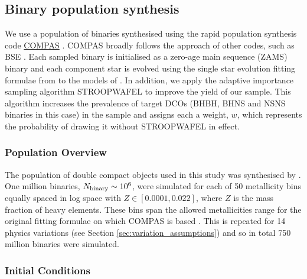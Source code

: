 \documentclass[twocolumn]{aastex63}
\begin{document}
\subsection{Binary population synthesis}\label{sec:COMPAS_explained}

We use a population of binaries synthesised using the rapid population synthesis code \href{https://compas.science}{COMPAS} \citep{Stevenson+2017, Vigna-Gomez+2018, Stevenson+2019}. COMPAS broadly follows the approach of other codes, such as BSE \citep{Hurley+2002}. Each sampled binary is initialised as a zero-age main sequence (ZAMS) binary and each component star is evolved using the single star evolution fitting formulae from \citet{Hurley+2000} to the models of \citet{Pols+1998}. In addition, we apply the adaptive importance sampling algorithm STROOPWAFEL \citep{Broekgaarden+2019} to improve the yield of our sample. This algorithm increases the prevalence of target DCOs (BHBH, BHNS and NSNS binaries in this case) in the sample and assigns each a weight, $w$, which represents the probability of drawing it without STROOPWAFEL in effect.

\subsubsection{Population Overview}

The population of double compact objects used in this study was synthesised by \citet{Broekgaarden+2021}. One million binaries, $N_{\rm binary} \sim 10^6$, were simulated for each of 50 metallicity bins equally spaced in log space with $Z \in [0.0001, 0.022]$, where $Z$ is the mass fraction of heavy elements. These bins span the allowed metallicities range for the original fitting formulae on which COMPAS is based \citep{Hurley+2000}. This is repeated for 14 physics variations (see Section \ref{sec:variation_assumptions}) and so in total 750 million binaries were simulated.

\subsubsection{Initial Conditions}
\end{document}
